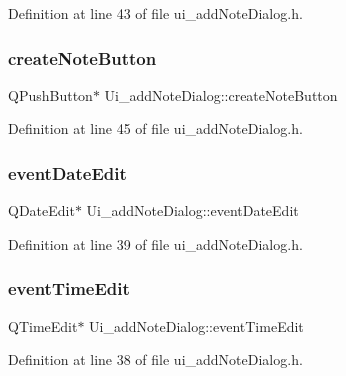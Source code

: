 Definition at line 43 of file ui\+\_\+add\+Note\+Dialog.\+h.

\hypertarget{classUi__addNoteDialog_a095d7b7256d2a2449943e7c4f0afa209}{}\label{classUi__addNoteDialog_a095d7b7256d2a2449943e7c4f0afa209} 
\subsubsection{\texorpdfstring{create\+Note\+Button}{createNoteButton}}
{\footnotesize\ttfamily Q\+Push\+Button$\ast$ Ui\+\_\+add\+Note\+Dialog\+::create\+Note\+Button}



Definition at line 45 of file ui\+\_\+add\+Note\+Dialog.\+h.

\hypertarget{classUi__addNoteDialog_adb9af8a9610aaea19686f07c381095a4}{}\label{classUi__addNoteDialog_adb9af8a9610aaea19686f07c381095a4} 
\subsubsection{\texorpdfstring{event\+Date\+Edit}{eventDateEdit}}
{\footnotesize\ttfamily Q\+Date\+Edit$\ast$ Ui\+\_\+add\+Note\+Dialog\+::event\+Date\+Edit}



Definition at line 39 of file ui\+\_\+add\+Note\+Dialog.\+h.

\hypertarget{classUi__addNoteDialog_a6c1f24a74ed0a88961136db719c3ae4e}{}\label{classUi__addNoteDialog_a6c1f24a74ed0a88961136db719c3ae4e} 
\subsubsection{\texorpdfstring{event\+Time\+Edit}{eventTimeEdit}}
{\footnotesize\ttfamily Q\+Time\+Edit$\ast$ Ui\+\_\+add\+Note\+Dialog\+::event\+Time\+Edit}



Definition at line 38 of file ui\+\_\+add\+Note\+Dialog.\+h.

